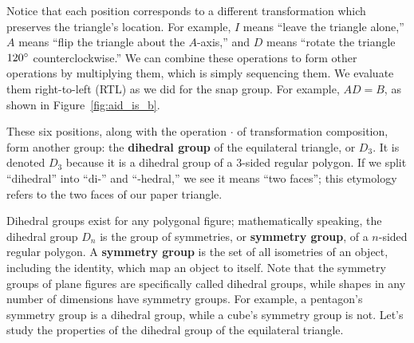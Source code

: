 \documentclass[../gatm.tex]{subfiles}
\begin{document}
Notice that each position corresponds to a different transformation which preserves the triangle's location. For example, $I$ means ``leave the triangle alone,'' $A$ means ``flip the triangle about the $A$-axis,'' and $D$ means ``rotate the triangle $120^\circ{}$ counterclockwise.'' We can combine these operations to form other operations by multiplying them, which is simply sequencing them. We evaluate them right-to-left (RTL) as we did for the snap group. For example, $AD=B$, as shown in Figure~\ref{fig:aid_is_b}.

These six positions, along with the operation $\cdot$ of transformation composition, form another group: the \textbf{dihedral group} of the equilateral triangle, or $D_3$. It is denoted $D_3$ because it is a dihedral group of a $3$-sided regular polygon. If we split ``dihedral'' into ``di-'' and ``-hedral,'' we see it means ``two faces''; this etymology refers to the two faces of our paper triangle.

Dihedral groups exist for any polygonal figure; mathematically speaking, the dihedral group $D_n$ is the group of symmetries, or \textbf{symmetry group}, of a $n$-sided regular polygon. A \textbf{symmetry group} is the set of all isometries of an object, including the identity, which map an object to itself. Note that the symmetry groups of plane figures are specifically called dihedral groups, while shapes in any number of dimensions have symmetry groups. For example, a pentagon's symmetry group is a dihedral group, while a cube's symmetry group is not. Let's study the properties of the dihedral group of the equilateral triangle.


\end{document}

